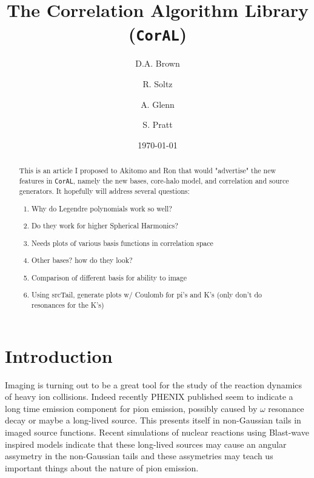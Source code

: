 \documentclass[aps,prl,twocolumn,floatfix,preprintnumbers,showpacs]{revtex4}
\newcommand{\CorAL}{{\tt CorAL}}
\begin{document}

\title{
      The Correlation Algorithm Library (\CorAL)    
}
\author{D.A. Brown} 
\author{R. Soltz}
\author{A. Glenn} 
\author{S. Pratt}
\affiliation{}

\date{\today}

\begin{abstract} 
This is an article I proposed to Akitomo and Ron that would "advertise" the new features in \CorAL, namely the new bases, core-halo model, and correlation and source generators. It hopefully will address several questions:
\begin{enumerate}
    \item Why do Legendre polynomials work so well?
    \item Do they work for higher Spherical Harmonics?
    \item Needs plots of various basis functions in correlation space
    \item Other bases? how do they look?
    \item Comparison of different basis for ability to image
    \item Using srcTail, generate plots w/ Coulomb for pi's and K's (only don't do resonances for the K's) 
\end{enumerate}
\end{abstract}


\maketitle

\section{Introduction}

Imaging is turning out to be a great tool for the study of the reaction dynamics of heavy ion collisions.  Indeed recently PHENIX published seem to indicate a long time emission component for pion emission, possibly caused by $\omega$ resonance decay or maybe a long-lived source.  This presents itself in non-Gaussian tails in imaged source functions.  Recent simulations of nuclear reactions using Blast-wave inspired models indicate that these long-lived sources may cause an angular assymetry in the non-Gaussian tails and these assymetries may teach us important things about the nature of pion emission.
\end{document}
